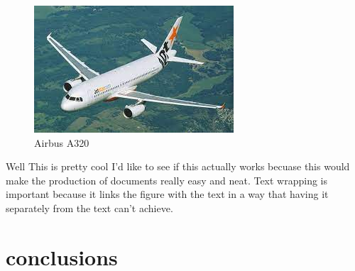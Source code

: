 \documentclass[a4paper]{report}
\begin{document}
\begin{figure}
\includegraphics[width=.5\textwidth]{picture.jpg}
\caption{Airbus A320}
\end{figure}

Well This is pretty cool I'd like to see if this actually works becuase this would make the production of documents really easy and neat. Text wrapping is important because it links the figure with the text in a way that having it separately from the text can't achieve. 
\blindtext[5
]
\chapter{conclusions}

\appendix
\end{document}
